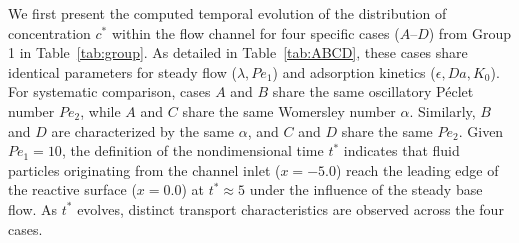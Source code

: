 \documentclass[lineno]{JFM-FLM_Au}
\begin{document}
{\color{blue}

We first present the computed temporal evolution of the distribution of concentration $c^*$ within the flow channel for four specific cases ($A$--$D$) from Group 1 in Table~\ref{tab:group}. As detailed in Table~\ref{tab:ABCD}, these cases share identical parameters for steady flow ($\lambda, Pe_1$) and adsorption kinetics ($\epsilon, Da, K_0$). For systematic comparison, cases $A$ and $B$ share the same oscillatory Péclet number $Pe_2$, while $A$ and $C$ share the same Womersley number $\alpha$. Similarly, $B$ and $D$ are characterized by the same $\alpha$, and $C$ and $D$ share the same $Pe_2$. Given $Pe_1 = 10$, the definition of the nondimensional time $t^*$ indicates that fluid particles originating from the channel inlet ($x = -5.0$) reach the leading edge of the reactive surface ($x = 0.0$) at $t^* \approx 5$ under the influence of the steady base flow. As $t^*$ evolves, distinct transport characteristics are observed across the four cases.

}
\end{document}

